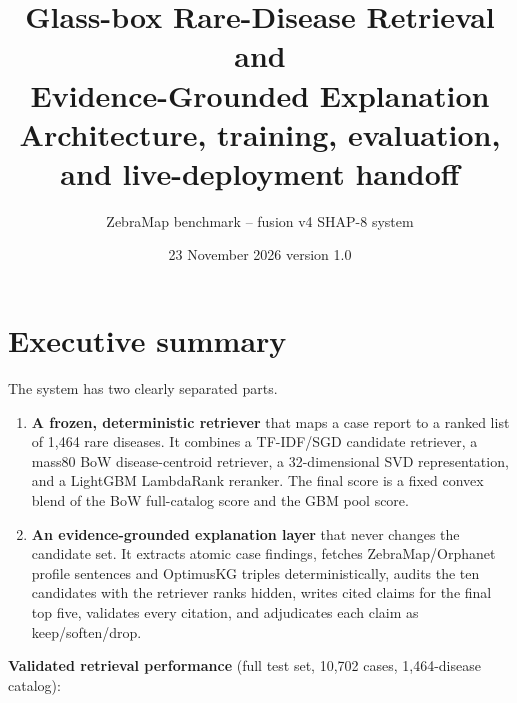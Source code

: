 \documentclass[11pt,a4paper]{article}
\title{\vspace{-1.2cm}\textbf{\color{navy}Glass-box Rare-Disease Retrieval and\\Evidence-Grounded Explanation}\\[0.3em]
\large Architecture, training, evaluation, and live-deployment handoff}
\author{ZebraMap benchmark -- fusion v4 SHAP-8 system}
\date{23 November 2026 \quad version 1.0}
\newcommand{\key}[1]{\textbf{#1}}
\begin{document}
\maketitle

\begin{center}
\end{center}

\tableofcontents

\newpage
\section{Executive summary}

The system has two clearly separated parts.

\begin{enumerate}[leftmargin=1.4em]
\item \textbf{A frozen, deterministic retriever} that maps a case report to a
ranked list of 1,464 rare diseases. It combines a TF-IDF/SGD candidate retriever,
a mass80 BoW disease-centroid retriever, a 32-dimensional SVD representation, and a
LightGBM LambdaRank reranker. The final score is a fixed convex blend of the BoW
full-catalog score and the GBM pool score.
\item \textbf{An evidence-grounded explanation layer} that never changes the
candidate set. It extracts atomic case findings, fetches ZebraMap/Orphanet profile
sentences and OptimusKG triples deterministically, audits the ten candidates with
the retriever ranks hidden, writes cited claims for the final top five, validates
every citation, and adjudicates each claim as keep/soften/drop.
\end{enumerate}

\key{Validated retrieval performance} (full test set, 10,702 cases, 1,464-disease
catalog):
\end{document}
